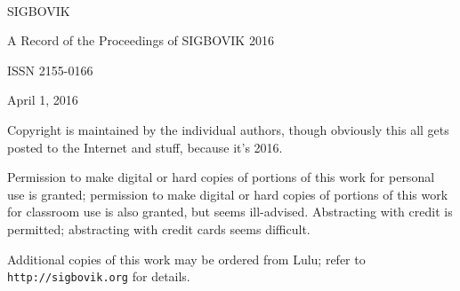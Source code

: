 \documentclass[12pt]{article}
\begin{document}
\newcommand\thisyear{2016}

\\
\vspace{10em}

SIGBOVIK

A Record of the Proceedings of SIGBOVIK \thisyear

ISSN 2155-0166

April 1, \thisyear

\vspace{2em}

Copyright is maintained by the individual authors, though obviously this all gets posted to the Internet and stuff, because it's \thisyear.

Permission to make digital or hard copies of portions of this work for personal use is granted; permission to make digital or hard copies of portions of this work for classroom use is also granted, but seems ill-advised.
Abstracting with credit is permitted; abstracting with credit cards seems difficult.

Additional copies of this work may be ordered from Lulu; refer to {\tt http://sigbovik.org} for details.

\thispagestyle{empty}
\end{document}
